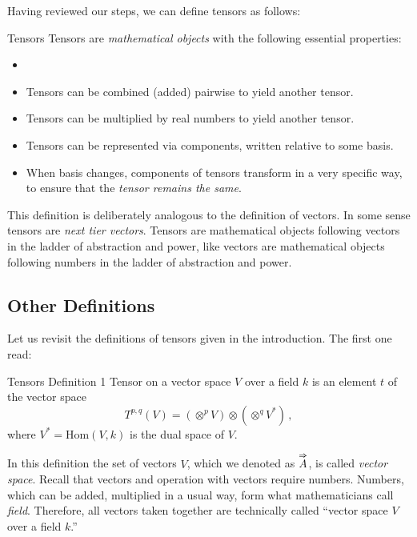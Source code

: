 Having reviewed our steps, we can define tensors as follows:
\begin{mydef}{Tensors}
  Tensors are \emph{mathematical objects} with the following essential properties:
  \begin{itemize}
    \item\phantom{x}
\item Tensors can be combined (added) pairwise to yield another tensor.
\item Tensors can be multiplied by real numbers to yield another tensor.
\item Tensors can be represented via components, written relative to some basis.
\item When basis changes, components of tensors transform in a very specific way, to
ensure that the \emph{tensor remains the same}.
  \end{itemize}
  \vspace{0.2cm}
\end{mydef}
This definition is deliberately analogous to the definition of
vectors. In some sense tensors are \emph{next tier vectors}. Tensors
are mathematical objects following vectors in the ladder of
abstraction and power, like vectors are mathematical objects following
numbers in the ladder of abstraction and power.
\subsection{Other Definitions}
Let us revisit the definitions of tensors given in the
introduction. The first one read:
\begin{mydef}{Tensors Definition 1}
Tensor on a vector space $V$ over a field $k$ is an element $t$ of the vector space
\begin{equation*}
	T^{p,q} (V) = (\otimes^p V)\otimes (\otimes^q V^*)\,,
\end{equation*}
where $V^*=\textrm{Hom}(V, k)$ is the dual space of $V$.
\vspace{0.2cm}
\end{mydef}
In this definition the set of vectors $V$, which we denoted as $\overset{\Rightarrow}{A}$,
is called \emph{vector space}. Recall that vectors and operation with
vectors require numbers. Numbers, which can be added, multiplied in a
usual way, form what mathematicians call \emph{field}. Therefore,
all vectors taken together are technically called
``vector space $V$ over a field $k$.''

